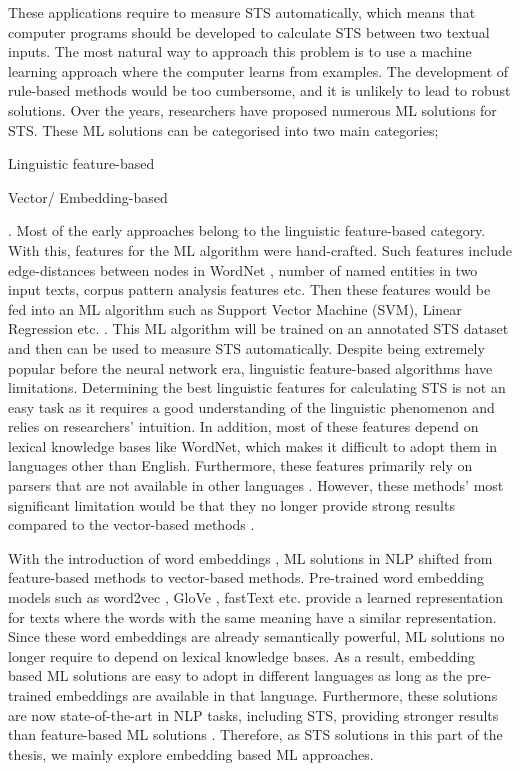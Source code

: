 These applications require to measure STS automatically, which means that computer programs should be developed to calculate STS between two textual inputs. The most natural way to approach this problem is to use a machine learning approach where the computer learns from examples. The development of rule-based methods would be too cumbersome, and it is unlikely to lead to robust solutions. Over the years, researchers have proposed numerous ML solutions for STS. These ML solutions can be categorised into two main categories; 
 \begin{enumerate*}[label=(\alph*)]
 	\item Linguistic feature-based
 	\item Vector/ Embedding-based
 \end{enumerate*}
. Most of the early approaches belong to the linguistic feature-based category. With this, features for the ML algorithm were hand-crafted. Such features include edge-distances between nodes in WordNet \autocite{10.1145/219717.219748}, number of named entities in two input texts, corpus pattern analysis features etc. Then these features would be fed into an ML algorithm such as Support Vector Machine (SVM), Linear Regression etc. \autocite{bechara-etal-2015-miniexperts}. This ML algorithm will be trained on an annotated STS dataset and then can be used to measure STS automatically. Despite being extremely popular before the neural network era, linguistic feature-based algorithms have limitations. Determining the best linguistic features for calculating STS is not an easy task as it requires a good understanding of the linguistic phenomenon and relies on researchers' intuition. In addition, most of these features depend on lexical knowledge bases like WordNet, which makes it difficult to adopt them in languages other than English. Furthermore, these features primarily rely on parsers that are not available in other languages \autocite{2016IJCA}. However, these methods' most significant limitation would be that they no longer provide strong results compared to the vector-based methods \autocite{cer-etal-2017-semeval}. 

With the introduction of word embeddings \autocite{DBLP:journals/corr/abs-1301-3781}, ML solutions in NLP shifted from feature-based methods to vector-based methods. Pre-trained word embedding models such as word2vec \autocite{DBLP:journals/corr/abs-1301-3781}, GloVe \autocite{pennington-etal-2014-glove},  fastText \autocite{mikolov-etal-2018-advances} etc. provide a learned representation for texts where the words with the same meaning have a similar representation. Since these word embeddings are already semantically powerful, ML solutions no longer require to depend on lexical knowledge bases. As a result, embedding based ML solutions are easy to adopt in different languages as long as the pre-trained embeddings are available in that language. Furthermore, these solutions are now state-of-the-art in NLP tasks, including STS, providing stronger results than feature-based ML solutions \autocite{cer-etal-2017-semeval}. Therefore, as STS solutions in this part of the thesis,  we mainly explore embedding based ML approaches.

